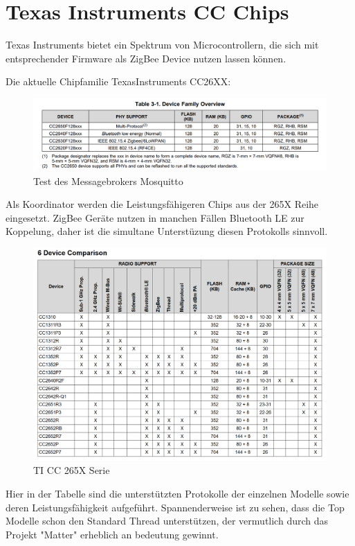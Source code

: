 \section{Texas Instruments CC Chips}

Texas Instruments bietet ein Spektrum von Microcontrollern, die sich mit entsprechender Firmware als ZigBee Device
nutzen lassen können. 

Die aktuelle Chipfamilie TexasInstruments CC26XX:

\begin{figure}[H]
  \centering
  \includegraphics[width=1\textwidth]{media/table26xx.png}
  \caption{Test des Messagebrokers Mosquitto}
\end{figure}

Als Koordinator werden die Leistungsfähigeren Chips aus der 265X Reihe eingesetzt. ZigBee Geräte nutzen in manchen
Fällen Bluetooth LE zur Koppelung, daher ist die simultane Unterstüzung diesen Protokolls sinnvoll.

\begin{figure}[H]
  \centering
  \includegraphics[width=1\textwidth]{media/table265x.png}
  \caption{TI CC 265X Serie}
\end{figure}

Hier in der Tabelle sind die unterstützten Protokolle der einzelnen Modelle sowie deren Leistungsfähigkeit aufgeführt.
Spannenderweise ist zu sehen, dass die Top Modelle schon den Standard Thread unterstützen, der vermutlich durch das
Projekt "Matter" erheblich an bedeutung gewinnt.

